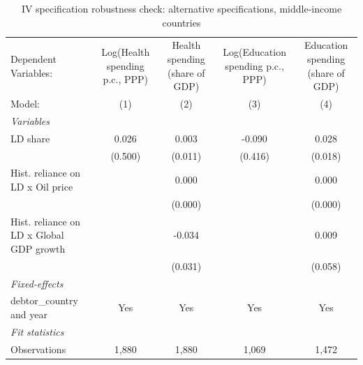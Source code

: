 
\begin{table}[htbp]
   \caption{\label{tab:IV_robustness_alt_specifications_other} IV specification robustness check: alternative specifications, middle-income countries}
   \centering
   \begin{tabular}{lcccc}
      \tabularnewline \midrule \midrule
      Dependent Variables:                     & Log(Health spending p.c., PPP) & Health spending (share of GDP) & Log(Education spending p.c., PPP) & Education spending (share of GDP)\\  
      Model:                                   & (1)                            & (2)                            & (3)                               & (4)\\  
      \midrule
      \emph{Variables}\\
      LD share                                 & 0.026                          & 0.003                          & -0.090                            & 0.028\\   
                                               & (0.500)                        & (0.011)                        & (0.416)                           & (0.018)\\   
      Hist. reliance on LD x Oil price         &                                & 0.000                          &                                   & 0.000\\   
                                               &                                & (0.000)                        &                                   & (0.000)\\   
      Hist. reliance on LD x Global GDP growth &                                & -0.034                         &                                   & 0.009\\   
                                               &                                & (0.031)                        &                                   & (0.058)\\   
      \midrule
      \emph{Fixed-effects}\\
      debtor\_country and year                 & Yes                            & Yes                            & Yes                               & Yes\\  
      \midrule
      \emph{Fit statistics}\\
      Observations                             & 1,880                          & 1,880                          & 1,069                             & 1,472\\  

\end{tabular}
\end{table}
